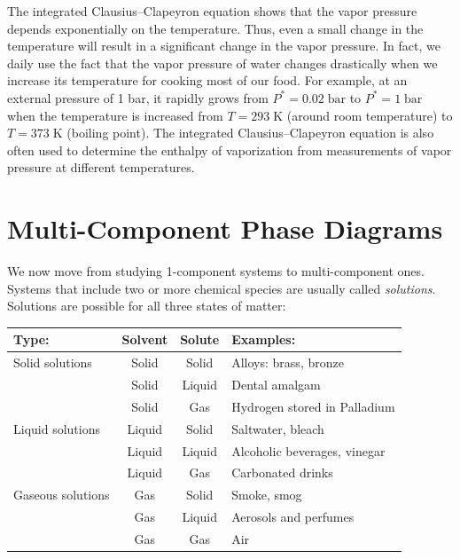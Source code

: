 \documentclass[
  9pt,
]{extbook}
\theoremstyle{definition}
\theoremstyle{definition}
\theoremstyle{definition}
\theoremstyle{remark}
\begin{document}
The integrated Clausius--Clapeyron equation shows that the vapor pressure depends exponentially on the temperature. Thus, even a small change in the temperature will result in a significant change in the vapor pressure. In fact, we daily use the fact that the vapor pressure of water changes drastically when we increase its temperature for cooking most of our food. For example, at an external pressure of 1 bar, it rapidly grows from \(P^*=0.02\;\text{bar}\) to \(P^*=1\;\text{bar}\) when the temperature is increased from \(T=293\;\mathrm{K}\) (around room temperature) to \(T=373\;\mathrm{K}\) (boiling point). The integrated Clausius--Clapeyron equation is also often used to determine the enthalpy of vaporization from measurements of vapor pressure at different temperatures.

\hypertarget{MCPhaseDiagrams}{%
\chapter{Multi-Component Phase Diagrams}\label{MCPhaseDiagrams}}

We now move from studying 1-component systems to multi-component ones. Systems that include two or more chemical species are usually called \emph{solutions}. Solutions are possible for all three states of matter:

\scriptsize

\begin{longtable}[]{@{}lccl@{}}
\toprule
Type: & Solvent & Solute & Examples: \\
\midrule
\endhead
Solid solutions & Solid & Solid & Alloys: brass, bronze \\
& Solid & Liquid & Dental amalgam \\
& Solid & Gas & Hydrogen stored in Palladium \\
Liquid solutions & Liquid & Solid & Saltwater, bleach \\
& Liquid & Liquid & Alcoholic beverages, vinegar \\
& Liquid & Gas & Carbonated drinks \\
Gaseous solutions & Gas & Solid & Smoke, smog \\
& Gas & Liquid & Aerosols and perfumes \\
& Gas & Gas & Air \\
\bottomrule
\end{longtable}

\normalsize
\end{document}
